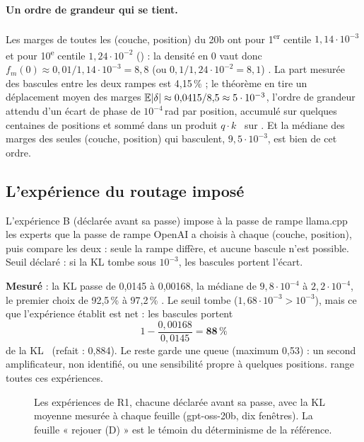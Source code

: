 \paragraph{Un ordre de grandeur qui se tient.} Les marges de toutes les (couche, position) du 20b ont pour 1\textsuperscript{er} centile $1{,}14\cdot10^{-3}$ et pour 10\textsuperscript{e} centile $1{,}24\cdot10^{-2}$ () : la densité en 0 vaut donc $f_m(0) \approx 0{,}01/1{,}14\cdot10^{-3} = 8{,}8$ (ou $0{,}1/1{,}24\cdot10^{-2} = 8{,}1$) \calc. La part mesurée des bascules entre les deux rampes est 4,15\,\% ; le théorème en tire un déplacement moyen des marges $\mathbb{E}|\delta| \approx 0{,}0415/8{,}5 \approx 5\cdot10^{-3}$, l'ordre de grandeur attendu d'un écart de phase de $10^{-4}$\,rad par position, accumulé sur quelques centaines de positions et sommé dans un produit $q\cdot k$ \calc~sur \mes. Et la médiane des marges des seules (couche, position) qui basculent, $9{,}5\cdot10^{-3}$, est bien de cet ordre.

\subsection{L'expérience du routage imposé}\label{sec:t2r-impose}

L'expérience B (déclarée avant sa passe) impose à la passe de rampe llama.cpp les experts que la passe de rampe OpenAI a choisis à chaque (couche, position), puis compare les deux : seule la rampe diffère, et aucune bascule n'est possible. Seuil déclaré : si la KL tombe sous $10^{-3}$, les bascules portent l'écart.

\textbf{Mesuré} : la KL passe de 0,0145 à 0,00168, la médiane de $9{,}8\cdot10^{-4}$ à $2{,}2\cdot10^{-4}$, le premier choix de 92,5\,\% à 97,2\,\% \mes. Le seuil tombe ($1{,}68\cdot10^{-3} > 10^{-3}$), mais ce que l'expérience établit est net : les bascules portent
\[
1 - \frac{0{,}00168}{0{,}0145} = \mathbf{88\,\%}
\]
de la KL \calc~(refait : 0,884). Le reste garde une queue (maximum 0,53) : un second amplificateur, non identifié, ou une sensibilité propre à quelques positions.  range toutes ces expériences.

\begin{figure}[ht]
\centering
\SchemaRefArbre
\caption[L'arbre des expériences de R1]{Les expériences de R1, chacune déclarée avant sa passe, avec la KL moyenne mesurée à chaque feuille (gpt-oss-20b, dix fenêtres). La feuille « rejouer (D) » est le témoin du déterminisme de la référence.}
\label{fig:t2r-arbre}
\end{figure}

